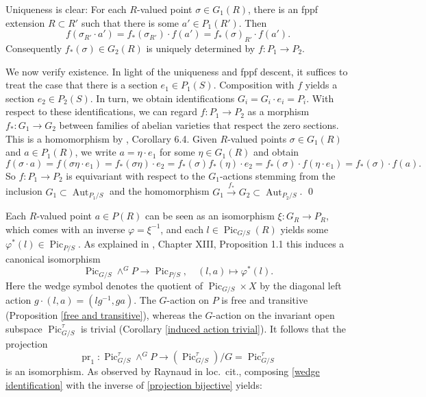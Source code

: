 \documentclass[oneside, 12pt]{amsart}
\theoremstyle{definition}
\theoremstyle{remark}
\newcommand{\Aut}{\operatorname{Aut}}
\newcommand{\lra}{\longrightarrow}
\newcommand{\Pic}{\operatorname{Pic}}
\newcommand{\pr}{\operatorname{pr}}
\newcommand{\ra}{\rightarrow}
\begin{document}
\proof
Uniqueness is clear: For each $R$-valued point $\sigma\in G_1(R)$, there is an fppf extension $R\subset R'$ such that
there is some $a'\in P_1(R')$. Then
$$
f(\sigma_{R'} \cdot a') = f_*(\sigma_{R'}) \cdot f(a') = f_*(\sigma)_{R'} \cdot f(a').
$$
Consequently $f_*(\sigma)\in G_2(R)$ is uniquely determined by $f:P_1\ra P_2$.

We now verify existence. In light of the uniqueness and fppf descent, it suffices to treat the case that there
is a section $e_1\in P_1(S)$. Composition with $f$ yields a section $e_2\in P_2(S)$.
In turn, we obtain identifications $G_i=G_i\cdot e_i= P_i$. With respect to these identifications,
we can regard $f:P_1\ra P_2$ as a morphism $f_*:G_1\ra G_2$ between families of abelian varieties
that respect  the zero sections. This is a homomorphism by \cite{Mumford; Fogarty; Kirwan 1993}, Corollary 6.4.
Given $R$-valued points $\sigma\in G_1(R)$ and $a\in P_1(R)$, we write $a=\eta\cdot e_1$ for some $\eta\in G_1(R)$
and obtain
$$
f(\sigma\cdot a) = f(\sigma\eta\cdot e_1) = f_*(\sigma\eta)\cdot e_2 = f_*(\sigma)f_*(\eta) \cdot e_2 = f_*(\sigma)\cdot f(\eta\cdot e_1) = f_*(\sigma) \cdot f(a).
$$
So $f:P_1\ra P_2$ is equivariant with respect to the $G_1$-actions stemming from  the inclusion
$G_1\subset\Aut_{P_1/S}$ and the homomorphism $ G_1\stackrel{f_*}{\ra} G_2\subset\Aut_{P_2/S}$.
\qed

\medskip
Each $R$-valued point $a\in P(R)$ can be seen as an isomorphism $\xi:G_R\ra P_R$, which comes
with an inverse $\varphi=\xi^{-1}$, and each $l\in\Pic_{G/S}(R)$ yields some $\varphi^*(l)\in \Pic_{P/S}$.
As explained in \cite{Raynaud 1970}, Chapter XIII, Proposition 1.1 this induces a  canonical isomorphism
\begin{equation}
\label{wedge identification}
\Pic_{G/S}\wedge^GP\lra \Pic_{P/S},\quad (l,a)\longmapsto \varphi^*(l).
\end{equation}
Here the wedge symbol denotes the quotient of $\Pic_{G/S}\times X$ by the diagonal left action $g\cdot(l,a)=(lg^{-1},ga)$.
The $G$-action on  $P$ is free and transitive (Proposition \ref{free and transitive}),
whereas the $G$-action on the  invariant open subspace $\Pic^\tau_{G/S}$ is   trivial (Corollary \ref{induced action trivial}).
It follows that the projection 
\begin{equation}
\label{projection bijective}
\pr_1:\Pic^\tau_{G/S}\wedge^GP\lra (\Pic^\tau_{G/S})/G=\Pic^\tau_{G/S}
\end{equation} 
is an isomorphism. As observed  by Raynaud in loc.\ cit., composing \eqref{wedge identification} with the inverse of \eqref{projection bijective} 
yields:
\end{document}
